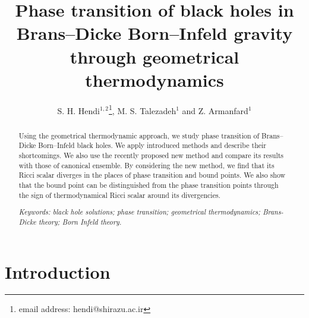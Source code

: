 \documentclass[aps,onecolumn ]{revtex4}
\begin{document}
\title{Phase transition of black holes in Brans--Dicke Born--Infeld gravity\\
through geometrical thermodynamics}
\author{S. H. Hendi$^{1,2}$\footnote{email address: hendi@shirazu.ac.ir}, M. S. Talezadeh$^{1}$ and Z.
Armanfard$^{1}$} 

\begin{abstract}
Using the geometrical thermodynamic approach, we study phase
transition of Brans--Dicke Born--Infeld black holes. We apply
introduced methods and describe their shortcomings. We also use
the recently proposed new method and compare its results with
those of canonical ensemble. By considering the new method, we
find that its Ricci scalar diverges in the places of phase
transition and bound points. We also show that the bound point can
be distinguished from the phase transition points through the sign
of thermodynamical Ricci scalar around its divergencies.

\emph{Keywords: black hole solutions; phase transition;
geometrical thermodynamics; Brans-Dicke theory; Born Infeld
theory.}
\end{abstract}

\maketitle

\section{Introduction}
\end{document}
